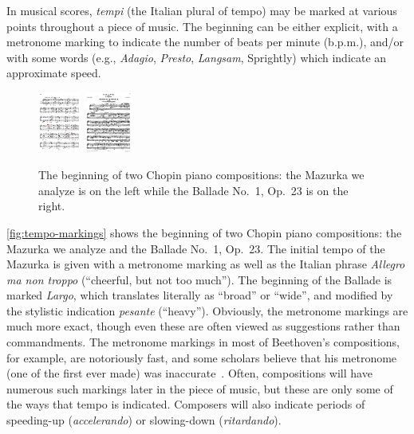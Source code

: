 \documentclass[aoas]{imsart}
\begin{document}
In musical scores, {\em tempi} (the Italian plural of tempo) may be
marked at various points throughout a piece of music. The
beginning can be either explicit, with a metronome marking to
indicate the number of beats per minute (b.p.m.), and/or with some words
(e.g., {\em Adagio}, {\em Presto}, {\em Langsam}, Sprightly) which indicate an
approximate speed. 
\begin{figure}[t!]
  \centering
  \includegraphics[height=2cm]{mazurka-top.pdf}
  \includegraphics[height=2cm]{ballade-top.pdf}
  \caption{The beginning of two Chopin piano compositions: the Mazurka
    we analyze is on the left while the Ballade No.\ 1, Op.\ 23 is on
    the right.}
  \label{fig:tempo-markings}
\end{figure}
\autoref{fig:tempo-markings} shows the beginning of two Chopin piano
compositions: the Mazurka we analyze and the Ballade No.\ 1, Op.\
23. The initial tempo of the Mazurka is given with a metronome
marking as well as the Italian phrase {\em Allegro ma non troppo}
(``cheerful, but not too much''). The beginning of the Ballade is 
marked {\em Largo}, which translates literally as ``broad'' or
``wide'', and modified by the stylistic indication {\em pesante}
(``heavy''). Obviously, the metronome markings are much more exact,
though even these are often viewed as suggestions rather than
commandments. The metronome markings in most of Beethoven's
compositions, for example, are notoriously fast, and some scholars
believe that his metronome (one of the first ever made) was
inaccurate~\citep{ForsenGray2013}. Often, compositions will have numerous such markings later
in the piece of music, but these are only some of the ways that tempo
is indicated. Composers will also indicate periods of speeding-up
(\emph{accelerando}) or
slowing-down (\emph{ritardando}).
\end{document}
